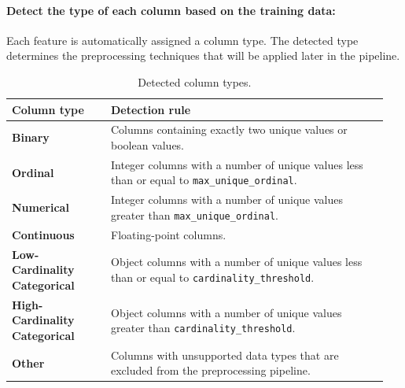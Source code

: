 \paragraph{Detect the type of each column based on the training data:}\par
Each feature is automatically assigned a column type. The detected type determines the preprocessing techniques that will be applied later in the pipeline.
\begin{table}[!htbp]
\centering
\caption{Detected column types.}
\begin{tabular}{p{0.25\linewidth}p{0.70\linewidth}}
\toprule
\textbf{Column type} & \textbf{Detection rule}\\
\midrule
\textbf{Binary} & Columns containing exactly two unique values or boolean values.\\
\textbf{Ordinal} & Integer columns with a number of unique values less than or equal to \texttt{max\_unique\_ordinal}.\\
\textbf{Numerical} & Integer columns with a number of unique values greater than \texttt{max\_unique\_ordinal}.\\
\textbf{Continuous} & Floating-point columns.\\
\textbf{Low-Cardinality Categorical} & Object columns with a number of unique values less than or equal to \texttt{cardinality\_threshold}.\\
\textbf{High-Cardinality Categorical} & Object columns with a number of unique values greater than \texttt{cardinality\_threshold}.\\
\textbf{Other} & Columns with unsupported data types that are excluded from the preprocessing pipeline.\\
\bottomrule
\end{tabular}
\end{table}
